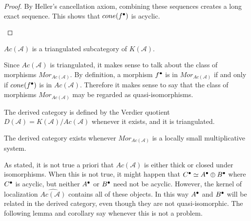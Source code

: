 \begin{proof}
        By Heller's cancellation axiom, combining these sequences creates a long exact sequence. This shows that $cone(f^{\bullet})$ is acyclic.
        \begin{center}
        \end{center}
    \end{proof}

    \begin{corollary}
        $Ac(\mathcal{A})$ is a triangulated subcategory of $K(\mathcal{A})$.
    \end{corollary}

    Since $Ac(\mathcal{A})$ is triangulated, it makes sense to talk about the class of morphisms $Mor_{Ac(\mathcal{A})}$. By definition, a morphism $f^{\bullet}$ is in $Mor_{Ac(\mathcal{A})}$ if and only if $cone(f^{\bullet})$ is in $Ac(\mathcal{A})$. Therefore it makes sense to say that the class of morphisms $Mor_{Ac(\mathcal{A})}$ may be regarded as quasi-isomorphisms. 

    \begin{corollary}
        The derived category is defined by the Verdier quotient $D(\mathcal{A})=K(\mathcal{A})/Ac(\mathcal{A})$ whenever it exists, and it is triangulated.
    \end{corollary}

    \begin{remark}
        The derived category exists whenever $Mor_{Ac(\mathcal{A})}$ is a locally small multiplicative system.
    \end{remark}

    As stated, it is not true a priori that $Ac(\mathcal{A})$ is either thick or closed under isomorphisms. When this is not true, it might happen that $C^{\bullet}\simeq A^{\bullet}\oplus B^{\bullet}$ where $C^{\bullet}$ is acyclic, but neither $A^{\bullet}$ or $B^{\bullet}$ need not be acyclic. However, the kernel of localization $\widehat{Ac(\mathcal{A})}$ contains all of these objects. In this way $A^{\bullet}$ and $B^{\bullet}$ will be related in the derived category, even though they are not quasi-isomorphic. The following lemma and corollary say whenever this is not a problem.

